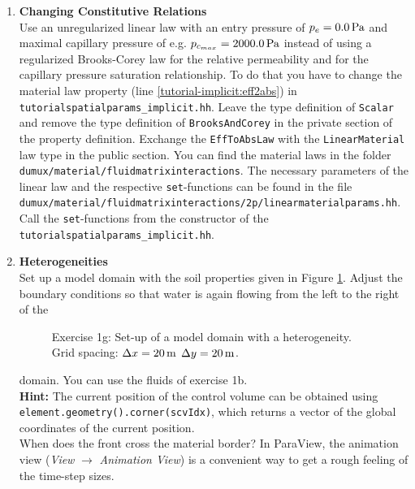 \begin{enumerate}
\item \textbf{Changing Constitutive Relations} \\
  Use an unregularized linear law with an entry pressure of $p_e = \unit[0.0]{Pa}$
  and maximal capillary pressure of e.g. $p_{c_{max}} = \unit[2000.0]{Pa}$ instead of using a
 regularized Brooks-Corey law for the
  relative permeability and for the capillary pressure saturation relationship.
  To do that you have
  to change the material law property (line \ref{tutorial-implicit:eff2abs}) in
  \texttt{tutorialspatialparams\_implicit.hh}. Leave the type definition of \texttt{Scalar} and remove
 the type definition of \texttt{BrooksAndCorey} in the private section of
 the property definition. Exchange the \texttt{EffToAbsLaw} with the \texttt{LinearMaterial} law type in the
public section.
 You can find the material laws in the folder
  \verb+dumux/material/fluidmatrixinteractions+. The necessary parameters
of the linear law and the respective \texttt{set}-functions can be found
 in the file \\
 \verb+dumux/material/fluidmatrixinteractions/2p/linearmaterialparams.hh+.\\
Call the \texttt{set}-functions from the constructor of the \texttt{tutorialspatialparams\_implicit.hh}.

\item \textbf{Heterogeneities}  \\
  Set up a model domain with the soil properties given in Figure
  \ref{tutorial-implicit:exercise1_d}. Adjust the boundary conditions
  so that water is again flowing from the left to the right of the
\begin{figure}[ht]
\centering
{}
\caption{Exercise 1g: Set-up of a model domain with a heterogeneity. Grid
spacing: $\Delta x = \unit[20]{m}$ $\Delta y = \unit[20]{m}$.}\label{tutorial-implicit:exercise1_d}
\end{figure}
domain. You can use the fluids of exercise 1b.\\
\textbf{Hint:} The current position of the control volume can be obtained
using \texttt{element\allowbreak.geometry()\allowbreak.corner(scvIdx)}, which
returns a vector of the global coordinates of the current position.\\
When does the front cross the material border? In ParaView, the
animation view (\textit{View} $\rightarrow$ \textit{Animation
  View}) is a convenient way to get a rough feeling of the time-step
sizes.
\end{enumerate}

